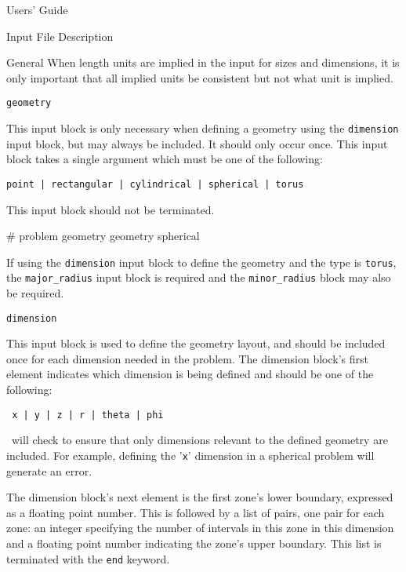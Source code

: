 \begin{chapter}{Users' Guide\label{app:user.guide}}
\begin{section}{Input File Description\label{app:user.input}}
\begin{subsection}{General}
      When length units are implied in the input for sizes and
      dimensions, it is only important that all implied units be
      consistent but not what unit is implied.
    \end{subsection}
    
    \begin{subsection}{\texttt{geometry}\label{app:user.input.geom}}
    
      This input block is only necessary when defining a geometry
      using the \texttt{dimension} input block, but may always be
      included.  It should only occur once.  This input block takes a
      single argument which must be one of the following:
      \begin{center}
        \texttt{point | rectangular | cylindrical | spherical | torus}
      \end{center}
      This input block should not be terminated.

      \begin{center}
        \renewcommand{\baselinestretch}{1}\normalsize
        \begin{boxedverbatim}
# problem geometry
geometry spherical          
\end{boxedverbatim}
      \end{center}

      If using the \texttt{dimension} input block to define the
      geometry and the type is \texttt{torus}, the
      \texttt{major\_radius} input block is required and the
      \texttt{minor\_radius} block may also be required.
    \end{subsection}

    \begin{subsection}{\texttt{dimension}\label{app:user.input.dim}}
      
      This input block is used to define the geometry layout, and
      should be included once for each dimension needed in the
      problem.  The dimension block's first element indicates which
      dimension is being defined and should be one of the following:
      \begin{center}
        \texttt{ x | y | z | r | theta | phi }
      \end{center}
      \ALARA\ will check to ensure that only dimensions relevant to
      the defined geometry are included.  For example, defining the
      '\texttt{x}' dimension in a spherical problem will generate an
      error.
      
      The dimension block's next element is the first zone's lower
      boundary, expressed as a floating point number.  This is
      followed by a list of pairs, one pair for each zone: an integer
      specifying the number of intervals in this zone in this
      dimension and a floating point number indicating the zone's
      upper boundary. This list is terminated with the \texttt{end}
      keyword.
      

\end{subsection}
\end{section}
\end{chapter}
